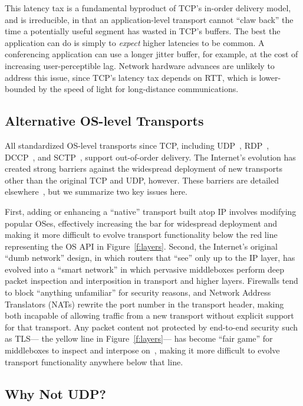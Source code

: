 This latency tax is a fundamental byproduct
of TCP's in-order delivery model,
and is irreducible,
in that an application-level transport
cannot ``claw back''
the time a potentially useful segment
has wasted in TCP's buffers.
The best the application can do is
simply to {\em expect} higher latencies to be common.
A conferencing application can use a longer jitter buffer,
for example,
at the cost of increasing user-perceptible lag.
Network hardware advances are unlikely to address this issue, 
since TCP's latency tax depends on RTT,
which is lower-bounded by the speed of light
for long-distance communications.

\subsection{Alternative OS-level Transports}
\label{sec:motiv-alts}

All standardized OS-level transports since TCP, including
	UDP~\cite{rfc768}, RDP~\cite{rfc908},
	DCCP~\cite{rfc4340}, and SCTP~\cite{rfc4960},
support out-of-order delivery.
The Internet's evolution has created strong barriers
against the widespread deployment of new transports
other than the original TCP and UDP, however.
These barriers are detailed elsewhere~\cite{
	rosenberg08udp,ford08breaking,popa10http},
but we summarize two key issues here.

First, 
adding or enhancing a ``native'' transport built atop IP
involves modifying popular OSes,
effectively increasing the bar for widespread deployment
and making it 
more difficult to evolve transport functionality
below the red line representing the OS API
in Figure~\ref{f:layers}.
Second, the Internet's original ``dumb network'' design,
in which routers that ``see'' only up to the IP layer,
has evolved into a ``smart network''
in which pervasive middleboxes
perform deep packet inspection and interposition
in transport and higher layers.
Firewalls tend to block ``anything unfamiliar'' for security reasons,
and Network Address Translators (NATs)
rewrite the port number in the  transport header,
making both incapable of allowing traffic from a new transport
without explicit support for that transport.
Any packet content
not protected by end-to-end security such as TLS---%
the yellow line in Figure~\ref{f:layers}---%
has become ``fair game''
for middleboxes to inspect and interpose on~\cite{
	reis08detecting},
making it more difficult to evolve transport functionality
anywhere below that line.


\subsection{Why Not UDP?}


